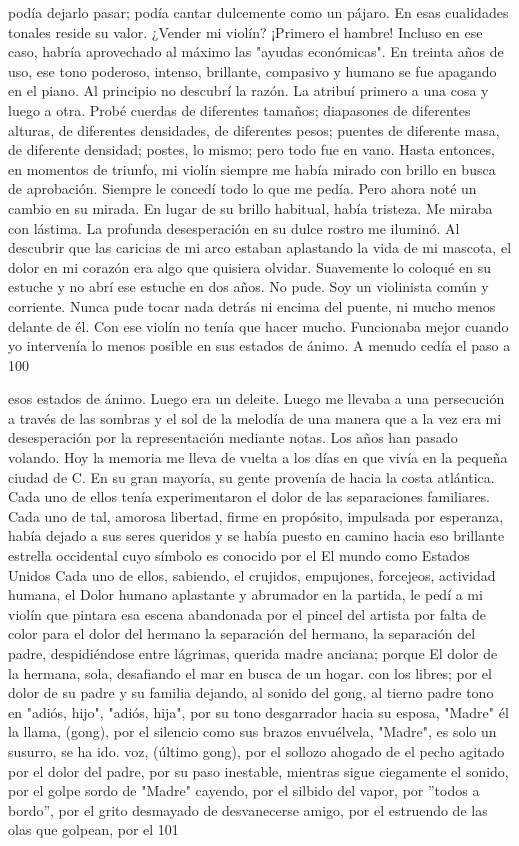 podía dejarlo pasar; podía cantar dulcemente como un pájaro. En esas cualidades tonales reside su valor.
¿Vender mi violín?
¡Primero el hambre!
Incluso en ese caso, habría aprovechado al máximo las "ayudas económicas".
En treinta años de uso, ese tono poderoso, intenso, brillante, compasivo y humano se fue apagando en el piano. Al principio no descubrí la razón. La atribuí primero a una cosa y luego a otra. Probé cuerdas de diferentes tamaños; diapasones de diferentes alturas, de diferentes densidades, de diferentes pesos; puentes de diferente masa, de diferente densidad; postes, lo mismo; pero todo fue en vano. Hasta entonces, en momentos de triunfo, mi violín siempre me había mirado con brillo en busca de aprobación. Siempre le concedí todo lo que me pedía. Pero ahora noté un cambio en su mirada. En lugar de su brillo habitual, había tristeza. Me miraba con lástima. La profunda desesperación en su dulce rostro me iluminó. Al descubrir que las caricias de mi arco estaban aplastando la vida de mi mascota, el dolor en mi corazón era algo que quisiera olvidar. Suavemente lo coloqué en su estuche y no abrí ese estuche en dos
años. No pude.
Soy un violinista común y corriente. Nunca pude tocar nada detrás ni encima del puente, ni mucho menos delante de él. Con ese violín no tenía que hacer mucho. Funcionaba mejor cuando yo intervenía lo menos posible en sus estados de ánimo. A menudo cedía el paso a
100

esos estados de ánimo. Luego era un deleite. Luego me llevaba a una persecución a través de las sombras y el sol de la melodía de una manera que a la vez era mi desesperación por la representación mediante notas. Los años han pasado volando. Hoy la memoria me lleva de vuelta a los días en que vivía en la pequeña ciudad de
C. En su gran mayoría, su gente provenía de
hacia la costa atlántica. Cada uno de ellos tenía
experimentaron el dolor de las separaciones familiares. Cada uno de
tal, amorosa libertad, firme en propósito, impulsada por
esperanza, había dejado a sus seres queridos y se había puesto en camino hacia eso
brillante estrella occidental cuyo símbolo es conocido por el
El mundo como Estados Unidos Cada uno de ellos, sabiendo, el
crujidos, empujones, forcejeos, actividad humana, el
Dolor humano aplastante y abrumador en la partida, le pedí a mi violín que pintara esa escena abandonada por el pincel del artista por falta de color para el dolor del hermano
la separación del hermano, la separación del padre,
despidiéndose entre lágrimas, querida madre anciana; porque
El dolor de la hermana, sola, desafiando el mar en busca de un hogar.
con los libres; por el dolor de su padre y su familia
dejando, al sonido del gong, al tierno padre
tono en "adiós, hijo", "adiós, hija",
por su tono desgarrador hacia su esposa, "Madre" él
la llama, (gong), por el silencio como sus brazos
envuélvela, "Madre", es solo un susurro, se ha ido.
voz, (último gong), por el sollozo ahogado de
el pecho agitado por el dolor del padre, por su paso inestable,
mientras sigue ciegamente el sonido, por el golpe sordo de
"Madre" cayendo, por el silbido del vapor, por
''todos a bordo'', por el grito desmayado de desvanecerse
amigo, por el estruendo de las olas que golpean, por el
101

